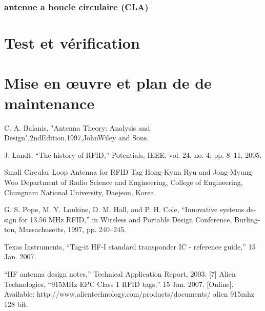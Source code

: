 \documentclass[11pt, a4paper, twoside]{book}
\begin{document}
\subsubsection{antenne a boucle circulaire (CLA)}

\section{Test	 et vérification	}
\section{Mise en	œuvre	 et	plan	de	de maintenance	}
		
\begin{thebibliography}{9}

C. A. Balanis, "Antenna Theory: Analysis and
Design",2ndEdition,1997,JohnWiley and Sons.
 



  J. Landt, “The history of RFID,” Potentials, IEEE, vol. 24, no. 4, pp. 8–11, 2005.

 Small Circular Loop Antenna for RFID Tag
Hong-Kyun Ryu and Jong-Myung Woo
Department of Radio Science and Engineering, College of Engineering, Chungnam National University, Daejeon, Korea

 G. S. Pope, M. Y. Loukine, D. M. Hall, and P. H. Cole, “Innovative systems de- sign for 13.56 MHz RFID,” in Wireless and Portable Design Conference, Burling- ton, Massachusetts, 1997, pp. 240–245.

  Texas Instruments, “Tag-it HF-I standard transponder IC - reference guide,” 15 Jan. 2007. 

  “HF antenna design notes,” Technical Application Report, 2003.
[7] Alien Technologies, “915MHz EPC Class 1 RFID tags,” 15 Jan. 2007. [Online]. Available: http://www.alientechnology.com/products/documents/
alien 915mhz 128 bit.%

\end{thebibliography}
\end{document}
